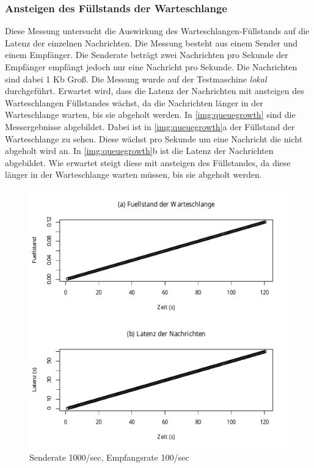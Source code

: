 \subsubsection{Ansteigen des Füllstands der Warteschlange}
\label{sec:queueGrowth}
Diese Messung untersucht die Auswirkung des Warteschlangen-Füllstands auf die Latenz der einzelnen Nachrichten. Die Messung besteht aus einem Sender und einem Empfänger. Die Senderate beträgt zwei Nachrichten pro Sekunde der Empfänger empfängt jedoch nur eine Nachricht pro Sekunde. Die Nachrichten sind dabei 1 Kb Groß. Die Messung wurde auf der Testmaschine \textit{lokal} durchgeführt. Erwartet wird, dass die Latenz der Nachrichten mit ansteigen des Warteschlangen Füllstandes wächst, da die Nachrichten länger in der Warteschlange warten, bis sie abgeholt werden.
In \autoref{img:queuegrowth} sind die Messergebnisse abgebildet. Dabei ist in \autoref{img:queuegrowth}a der Füllstand der Warteschlange zu sehen. Diese wächst pro Sekunde um eine Nachricht die nicht abgeholt wird an. In \autoref{img:queuegrowth}b ist die Latenz der Nachrichten abgebildet. Wie erwartet steigt diese mit ansteigen des Füllstandes, da diese länger in der Warteschlange warten müssen, bis sie abgeholt werden.
\begin{figure}
\center
  \includegraphics[width=1\textwidth]{images/measurement/queuegrowth.pdf}
  \caption{Senderate 1000/sec, Empfangsrate 100/sec}
  \label{img:queuegrowth}
\end{figure}

